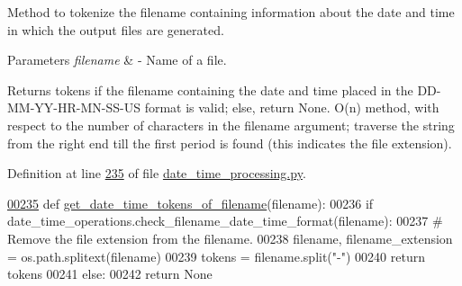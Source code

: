 Method to tokenize the filename containing information about the date and time in which the output files are generated. 


\begin{DoxyParams}{Parameters}
{\em filename} & -\/ Name of a file. \\
\hline
\end{DoxyParams}
\begin{DoxyReturn}{Returns}
tokens if the filename containing the date and time placed in the D\+D-\/\+M\+M-\/\+Y\+Y-\/\+H\+R-\/\+M\+N-\/\+S\+S-\/\+U\+S format is valid; else, return None. O(n) method, with respect to the number of characters in the filename argument; traverse the string from the right end till the first period is found (this indicates the file extension). 
\end{DoxyReturn}


Definition at line \hyperlink{date__time__processing_8py_source_l00235}{235} of file \hyperlink{date__time__processing_8py_source}{date\+\_\+time\+\_\+processing.\+py}.


\begin{DoxyCode}
\hypertarget{classutilities_1_1date__time__processing_1_1date__time__operations_l00235}{}\hyperlink{classutilities_1_1date__time__processing_1_1date__time__operations_ad6047ac1098493c3511ec209f52250c0}{00235}     \textcolor{keyword}{def }\hyperlink{classutilities_1_1date__time__processing_1_1date__time__operations_ad6047ac1098493c3511ec209f52250c0}{get\_date\_time\_tokens\_of\_filename}(filename):
00236         \textcolor{keywordflow}{if} date\_time\_operations.check\_filename\_date\_time\_format(filename):
00237             \textcolor{comment}{# Remove the file extension from the filename.}
00238             filename, filename\_extension = os.path.splitext(filename)
00239             tokens = filename.split(\textcolor{stringliteral}{"-"})
00240             \textcolor{keywordflow}{return} tokens
00241         \textcolor{keywordflow}{else}:
00242             \textcolor{keywordflow}{return} \textcolor{keywordtype}{None}
\end{DoxyCode}
\hypertarget{classutilities_1_1date__time__processing_1_1date__time__operations_a15c6ea3d519b1665781fd9dcddec04a6}{}
